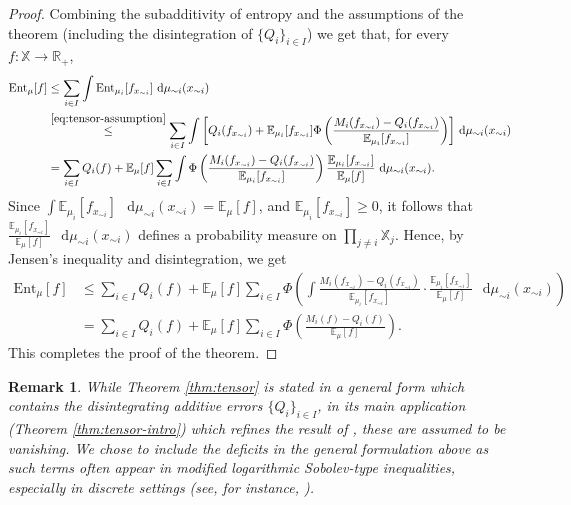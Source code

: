 \documentclass[a4paper,twoside,11pt,reqno]{amsart}
\newtheorem{remark}[theorem]{Remark}
\newcommand*\diff{\mathop{}\!\mathrm{d}}
\newcommand{\R}{\mathbb{R}} %
\newcommand{\mb}{\mathbb}
\newcommand{\mr}{\mathrm}
\begin{document}
\begin{proof}
Combining the subadditivity of entropy and the assumptions of the theorem (including the disintegration of $\{Q_i\}_{i\in I}$) we get that, for every $f:\mathbb X\to \R_{+}$,
\begin{equation}
\begin{split}
\mr{Ent}_\mu[f] &\le \sum_{i\in I}\int \mr{Ent}_{\mu_i}[f_{x_{\sim i}}]\,\diff\mu_{\sim i}(x_{\sim i})\\
&\stackrel{\eqref{eq:tensor-assumption}}{\leq}\sum_{i\in I} \int \left [Q_i(f_{x_{\sim i}})+\mb{E}_{\mu_i}[f_{x_{\sim i}}]\Phi\left(\frac{M_i(f_{x_{\sim i}})-Q_i(f_{x_{\sim i}})}{\mb{E}_{\mu_i}[f_{x_{\sim i}}]}\right)\right] \,\diff\mu_{\sim i}(x_{\sim i})\\
&= \sum_{i\in I}Q_i(f)+ \mb{E}_{\mu}[f] \sum_{i\in I} \int \Phi\left(\frac{M_i(f_{x_{\sim i}})-Q_i(f_{x_{\sim i}})}{\mb{E}_{\mu_i}[f_{x_{\sim i}}]}\right)\frac{\mb{E}_{\mu_i}[f_{x_{\sim i}}]}{\mb{E}_{\mu}[f]} \,\diff\mu_{\sim i}(x_{\sim i}).
\end{split}
\end{equation}
Since $\int \mb{E}_{\mu_i}[f_{x_{\sim i}}]\,\diff\mu_{\sim i}(x_{\sim i})= \mb{E}_{\mu}[f]$, and $\mb{E}_{\mu_i}[f_{x_{\sim i}}]\ge 0$, it follows that $\frac{\mb{E}_{\mu_i}[f_{x_{\sim i}}]}{\mb{E}_{\mu}[f]}\,\diff\mu_{\sim i}(x_{\sim i})$ defines a probability measure on $\prod_{j\neq i}\mathbb X_j$. Hence, by Jensen's inequality and disintegration, we get
\begin{equation}
\begin{split}
\mr{Ent}_\mu[f]&\le \sum_{i\in I}Q_i(f)+ \mb{E}_{\mu}[f]\sum_{i\in I} \Phi\left(\int \frac{M_i(f_{x_{\sim i}})-Q_i(f_{x_{\sim i}})}{\mb{E}_{\mu_i}[f_{x_{\sim i}}]}\cdot\frac{\mb{E}_{\mu_i}[f_{x_{\sim i}}]}{\mb{E}_{\mu}[f]} \,\diff\mu_{\sim i}(x_{\sim i})\right)\\
&= \sum_{i\in I}Q_i(f)+ \mb{E}_{\mu}[f] \sum_{i\in I} \Phi\left(\frac{M_i(f)-Q_i(f)}{\mb{E}_{\mu}[f]}\right).
\end{split}
\end{equation}
This completes the proof of the theorem.
\end{proof}

\begin{remark}
While Theorem \ref{thm:tensor} is stated in a general form which contains the disintegrating additive errors $\{Q_i\}_{i\in I}$, in its main application (Theorem \ref{thm:tensor-intro}) which refines the result of \cite{PS19}, these are assumed to be vanishing.   We chose to include the deficits in the general formulation above as such terms often appear in modified logarithmic Sobolev-type inequalities, especially in discrete settings (see, for instance, \cite{BL98, Wu00, BT06, Joh17}).
\end{remark}
\end{document}
